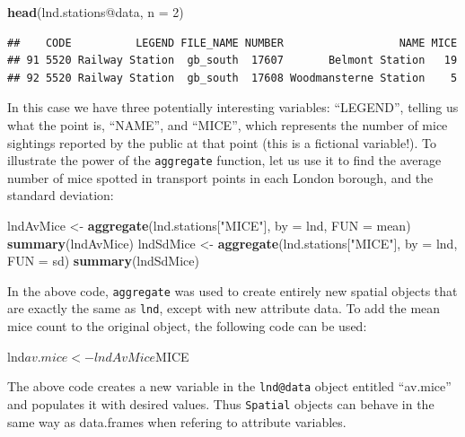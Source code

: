 \documentclass[]{article}
\newenvironment{Shaded}{}{}
\newcommand{\KeywordTok}[1]{\textcolor[rgb]{0.00,0.44,0.13}{\textbf{{#1}}}}
\newcommand{\DataTypeTok}[1]{\textcolor[rgb]{0.56,0.13,0.00}{{#1}}}
\newcommand{\DecValTok}[1]{\textcolor[rgb]{0.25,0.63,0.44}{{#1}}}
\newcommand{\StringTok}[1]{\textcolor[rgb]{0.25,0.44,0.63}{{#1}}}
\newcommand{\NormalTok}[1]{{#1}}
\begin{document}
\begin{Shaded}
\begin{Highlighting}[]
\KeywordTok{head}\NormalTok{(lnd.stations@data, }\DataTypeTok{n =} \DecValTok{2}\NormalTok{)}
\end{Highlighting}
\end{Shaded}
\begin{verbatim}
##    CODE          LEGEND FILE_NAME NUMBER                  NAME MICE
## 91 5520 Railway Station  gb_south  17607       Belmont Station   19
## 92 5520 Railway Station  gb_south  17608 Woodmansterne Station    5
\end{verbatim}
In this case we have three potentially interesting variables:
``LEGEND'', telling us what the point is, ``NAME'', and ``MICE'', which
represents the number of mice sightings reported by the public at that
point (this is a fictional variable!). To illustrate the power of the
\texttt{aggregate} function, let us use it to find the average number of
mice spotted in transport points in each London borough, and the
standard deviation:

\begin{Shaded}
\begin{Highlighting}[]
\NormalTok{lndAvMice <- }\KeywordTok{aggregate}\NormalTok{(lnd.stations[}\StringTok{"MICE"}\NormalTok{], }\DataTypeTok{by =} \NormalTok{lnd, }\DataTypeTok{FUN =} \NormalTok{mean)}
\KeywordTok{summary}\NormalTok{(lndAvMice)}
\NormalTok{lndSdMice <- }\KeywordTok{aggregate}\NormalTok{(lnd.stations[}\StringTok{"MICE"}\NormalTok{], }\DataTypeTok{by =} \NormalTok{lnd, }\DataTypeTok{FUN =} \NormalTok{sd)}
\KeywordTok{summary}\NormalTok{(lndSdMice)}
\end{Highlighting}
\end{Shaded}
In the above code, \texttt{aggregate} was used to create entirely new
spatial objects that are exactly the same as \texttt{lnd}, except with
new attribute data. To add the mean mice count to the original object,
the following code can be used:

\begin{Shaded}
\begin{Highlighting}[]
\NormalTok{lnd$av.mice <- lndAvMice$MICE}
\end{Highlighting}
\end{Shaded}
The above code creates a new variable in the \texttt{lnd@data} object
entitled ``av.mice'' and populates it with desired values. Thus
\texttt{Spatial} objects can behave in the same way as data.frames when
refering to attribute variables.
\end{document}
